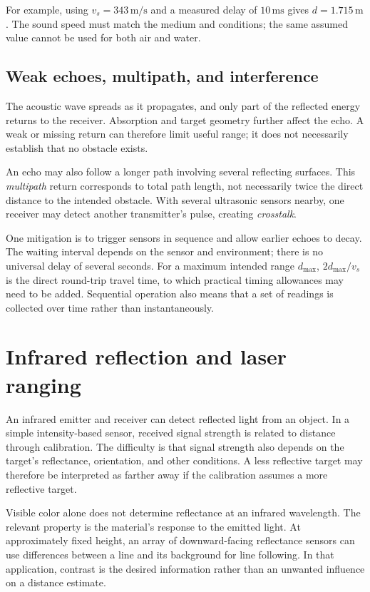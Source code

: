 For example, using $v_s=343\,\mathrm{m/s}$ and a measured delay of
$10\,\mathrm{ms}$ gives $d=1.715\,\mathrm m$. The sound speed must match
the medium and conditions; the same assumed value cannot be used for both
air and water.

\subsection{Weak echoes, multipath, and interference}
The acoustic wave spreads as it propagates, and only part of the reflected
energy returns to the receiver. Absorption and target geometry further affect
the echo. A weak or missing return can therefore limit useful range; it does
not necessarily establish that no obstacle exists.

An echo may also follow a longer path involving several reflecting surfaces.
This \emph{multipath} return corresponds to total path length, not necessarily
twice the direct distance to the intended obstacle. With several ultrasonic
sensors nearby, one receiver may detect another transmitter's pulse,
creating \emph{crosstalk}.

One mitigation is to trigger sensors in sequence and allow earlier echoes
to decay. The waiting interval depends on the sensor and environment; there
is no universal delay of several seconds. For a maximum intended range
$d_{\max}$, $2d_{\max}/v_s$ is the direct round-trip travel time, to which
practical timing allowances may need to be added. Sequential operation also
means that a set of readings is collected over time rather than instantaneously.

\section{Infrared reflection and laser ranging}
An infrared emitter and receiver can detect reflected light from an object.
In a simple intensity-based sensor, received signal strength is related to
distance through calibration. The difficulty is that signal strength also
depends on the target's reflectance, orientation, and other conditions.
A less reflective target may therefore be interpreted as farther away if
the calibration assumes a more reflective target.

Visible color alone does not determine reflectance at an infrared wavelength.
The relevant property is the material's response to the emitted light.
At approximately fixed height, an array of downward-facing reflectance
sensors can use differences between a line and its background for line
following. In that application, contrast is the desired information rather
than an unwanted influence on a distance estimate.

